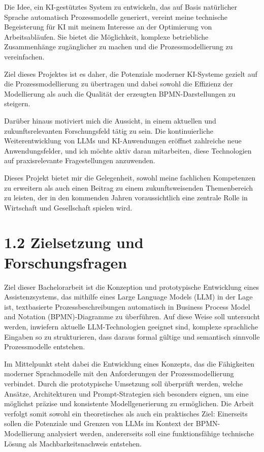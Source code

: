 \documentclass[a4paper,12pt]{scrreprt}
\begin{document}
Die Idee, ein KI-gestütztes System zu entwickeln, das auf Basis natürlicher Sprache automatisch Prozessmodelle generiert, vereint meine technische Begeisterung für KI mit meinem Interesse an der Optimierung von Arbeitsabläufen. Sie bietet die Möglichkeit, komplexe betriebliche Zusammenhänge zugänglicher zu machen und die Prozessmodellierung zu vereinfachen. 

Ziel dieses Projektes ist es daher, die Potenziale moderner KI-Systeme gezielt auf die Prozessmodellierung zu übertragen und dabei sowohl die Effizienz der Modellierung als auch die Qualität der erzeugten BPMN-Darstellungen zu steigern.

Darüber hinaus motiviert mich die Aussicht, in einem aktuellen und zukunftsrelevanten Forschungsfeld tätig zu sein. Die kontinuierliche Weiterentwicklung von LLMs und KI-Anwendungen eröffnet zahlreiche neue Anwendungsfelder, und ich möchte aktiv daran mitarbeiten, diese Technologien auf praxisrelevante Fragestellungen anzuwenden.

Dieses Projekt bietet mir die Gelegenheit, sowohl meine fachlichen Kompetenzen zu erweitern als auch einen Beitrag zu einem zukunftsweisenden Themenbereich zu leisten, der in den kommenden Jahren voraussichtlich eine zentrale Rolle in Wirtschaft und Gesellschaft spielen wird.

\section*{1.2 Zielsetzung und Forschungsfragen}

Ziel dieser Bachelorarbeit ist die Konzeption und prototypische Entwicklung eines Assistenzsystems, das mithilfe eines Large Language Models (LLM) in der Lage ist, textbasierte Prozessbeschreibungen automatisch in Business Process Model and Notation (BPMN)-Diagramme zu überführen. Auf diese Weise soll untersucht werden, inwiefern aktuelle LLM-Technologien geeignet sind, komplexe sprachliche Eingaben so zu strukturieren, dass daraus formal gültige und semantisch sinnvolle Prozessmodelle entstehen. 

Im Mittelpunkt steht dabei die Entwicklung eines Konzepts, das die Fähigkeiten moderner Sprachmodelle mit den Anforderungen der Prozessmodellierung verbindet. Durch die prototypische Umsetzung soll überprüft werden, welche Ansätze, Architekturen und Prompt-Strategien sich besonders eignen, um eine möglichst präzise und konsistente Modellgenerierung zu ermöglichen. Die Arbeit verfolgt somit sowohl ein theoretisches als auch ein praktisches Ziel: Einerseits sollen die Potenziale und Grenzen von LLMs im Kontext der BPMN-Modellierung analysiert werden, andererseits soll eine funktionsfähige technische Lösung als Machbarkeitsnachweis entstehen.
\end{document}
